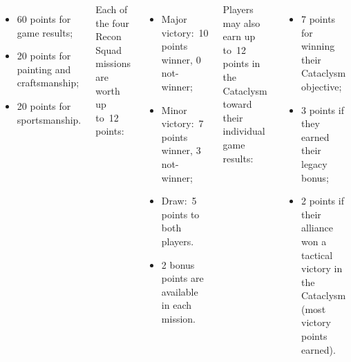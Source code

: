 \begin{columns}
\begin{itemize}\shortlist
\item 60 points for game results;
\item 20 points for painting and craftsmanship;
\item 20 points for sportsmanship.
\end{itemize}


Each of the four Recon Squad missions are worth up to~12 points:


\begin{itemize}\shortlist
\item Major victory:~10 points winner, 0 not-winner;
\item Minor victory:~7 points winner, 3 not-winner;
\item Draw:~5 points to both players.
\item 2 bonus points are available in each mission.
\end{itemize}


Players may also earn up to~12 points in the Cataclysm toward their
individual game results:
\begin{itemize}\shortlist
\item 7 points for winning their Cataclysm objective;
\item 3 points if they earned their legacy bonus;
\item 2 points if their alliance won a tactical victory in the
  Cataclysm (most victory points earned).
\end{itemize}

\columnbreak
{} 


\end{columns}
